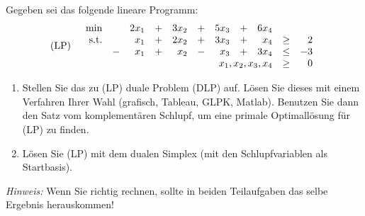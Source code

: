 \documentclass[11pt,german,a4paper,parskip=half-]{scrartcl}
\begin{document}
\maketitle
\begin{exercise}{4}
 Gegeben sei das folgende lineare Programm:
\[\text{(LP)}\quad\begin{array}{rcrcrcrcrcr}
\min && 2x_{1} &+& 3x_{2} &+& 5x_{3} &+& 6x_{4} \\
\text{s.t.} && x_{1} &+& 2x_{2} &+& 3x_{3} &+& x_{4} &\geq& 2\\
&-& x_{1} &+& x_{2} &-& x_{3} &+& 3x_{4} &\leq& -3 \\
&&&&& \multicolumn{4}{r}{x_{1},x_{2},x_{3},x_{4}}&\geq& 0
\end{array}\]
\begin{enumerate}
 \item Stellen Sie das zu (LP) duale Problem (DLP) auf. Lösen Sie dieses mit einem Verfahren Ihrer Wahl (grafisch, Tableau, GLPK, Matlab).
  Benutzen Sie dann den Satz vom komplementären Schlupf, um eine primale Optimallösung für (LP) zu finden.
 \item Lösen Sie (LP) mit dem dualen Simplex (mit den Schlupfvariablen als Startbasis).
\end{enumerate}
{\it Hinweis:} Wenn Sie richtig rechnen, sollte in beiden Teilaufgaben das selbe Ergebnis herauskommen!
\end{exercise}
\end{document}
